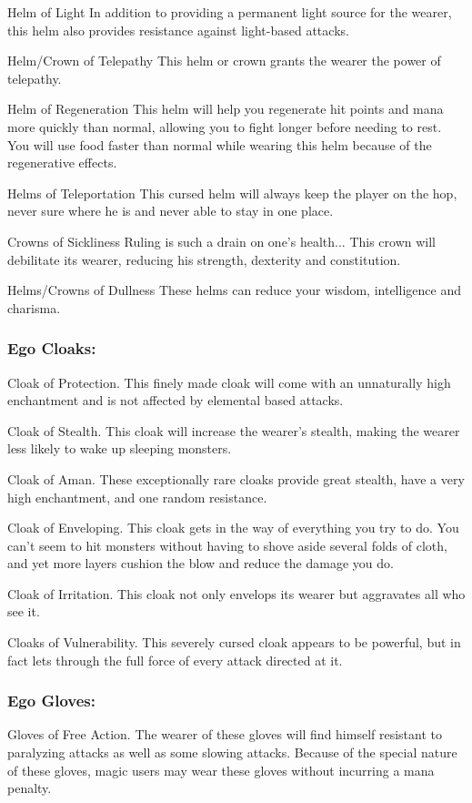 Helm of Light
     In addition to providing a permanent light source for the wearer, this
     helm also provides resistance against light-based attacks.

Helm/Crown of Telepathy
     This helm or crown grants the wearer the power of telepathy.

Helm of Regeneration
     This helm will help you regenerate hit points and mana more quickly
     than normal, allowing you to fight longer before needing to rest. You
     will use food faster than normal while wearing this helm because of
     the regenerative effects.

Helms of Teleportation
     This cursed helm will always keep the player on the hop, never sure
     where he is and never able to stay in one place.

Crowns of Sickliness
     Ruling is such a drain on one's health... This crown will debilitate
     its wearer, reducing his strength, dexterity and constitution.

Helms/Crowns of Dullness
     These helms can reduce your wisdom, intelligence and charisma.
 
\subsubsection{Ego Cloaks:}
Cloak of Protection.
     This finely made cloak will come with an unnaturally high enchantment
     and is not affected by elemental based attacks.

Cloak of Stealth.
     This cloak will increase the wearer's stealth, making the wearer less
     likely to wake up sleeping monsters.

Cloak of Aman.
     These exceptionally rare cloaks provide great stealth, have a very
     high enchantment, and one random resistance.

Cloak of Enveloping.
     This cloak gets in the way of everything you try to do. You can't seem
     to hit monsters without having to shove aside several folds of cloth,
     and yet more layers cushion the blow and reduce the damage you do.

Cloak of Irritation.
     This cloak not only envelops its wearer but aggravates all who see it.

Cloaks of Vulnerability.
     This severely cursed cloak appears to be powerful, but in fact lets
     through the full force of every attack directed at it.

\subsubsection{Ego Gloves:}
Gloves of Free Action.
     The wearer of these gloves will find himself resistant to paralyzing
     attacks as well as some slowing attacks. Because of the special
     nature of these gloves, magic users may wear these gloves without
     incurring a mana penalty.

